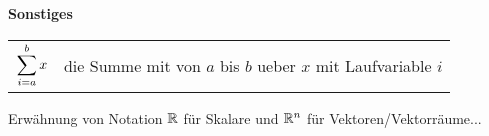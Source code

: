 \begin{center}\textbf{Sonstiges}\end{center}
\begin{tabular}{cl}
  $\displaystyle\sum_{i=a}^b x$ & die Summe mit von $a$ bis $b$ ueber $x$ mit Laufvariable $i$ \\
\end{tabular}

Erwähnung von Notation $\mathbb{R}$ für Skalare und $\mathbb{R}^n$ für Vektoren/Vektorräume...


